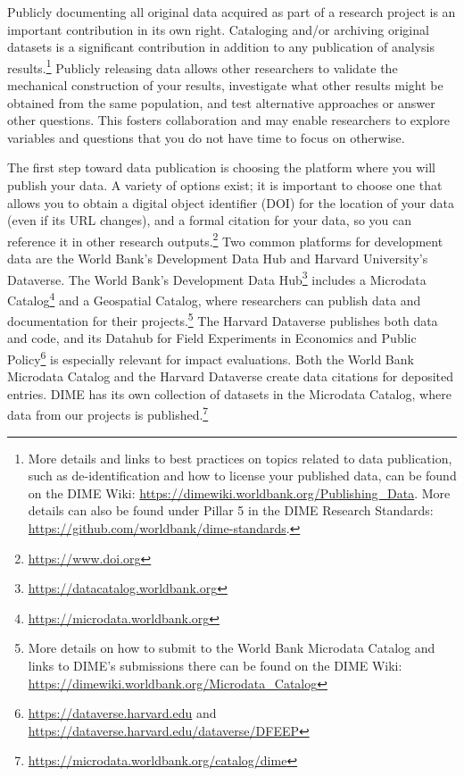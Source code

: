 \documentclass[
]{book}
\begin{document}
Publicly documenting all original data acquired as part of a research project
is an important contribution in its own right.
Cataloging and/or archiving original datasets
is a significant contribution in addition to any publication of analysis results.\footnote{More details and links to best practices on topics related to data publication,
  such as de-identification and how to license your published data,
  can be found on the DIME Wiki:
  \url{https://dimewiki.worldbank.org/Publishing_Data}.
  More details can also be found under Pillar 5 in the DIME Research Standards:
  \url{https://github.com/worldbank/dime-standards}.}
Publicly releasing data allows other researchers
to validate the mechanical construction of your results,
investigate what other results might be obtained from the same population,
and test alternative approaches or answer other questions.
This fosters collaboration and may enable researchers to explore variables and
questions that you do not have time to focus on otherwise.

The first step toward data publication is choosing the platform
where you will publish your data.
A variety of options exist;
it is important to choose one that allows you to obtain a digital object identifier (DOI)
for the location of your data (even if its URL changes),
and a formal citation for your data, so you can reference it in other research outputs.\footnote{\url{https://www.doi.org}}
Two common platforms for development data are the World Bank's Development Data Hub
and Harvard University's Dataverse.
The World Bank's Development Data Hub\footnote{\url{https://datacatalog.worldbank.org}}
includes a Microdata Catalog\footnote{\url{https://microdata.worldbank.org}}
and a Geospatial Catalog,
where researchers can publish data and documentation for their projects.\footnote{More details on how to submit to the World Bank Microdata Catalog and
  links to DIME's submissions there can be found on the DIME Wiki:
  \url{https://dimewiki.worldbank.org/Microdata_Catalog}}
The Harvard Dataverse publishes both data and code,
and its Datahub for Field Experiments in Economics and Public Policy\footnote{\url{https://dataverse.harvard.edu} and
  \url{https://dataverse.harvard.edu/dataverse/DFEEP}}
is especially relevant for impact evaluations.
Both the World Bank Microdata Catalog and the Harvard Dataverse
create data citations for deposited entries.
DIME has its own collection of datasets in the Microdata Catalog,
where data from our projects is published.\footnote{\url{https://microdata.worldbank.org/catalog/dime}}
\end{document}
